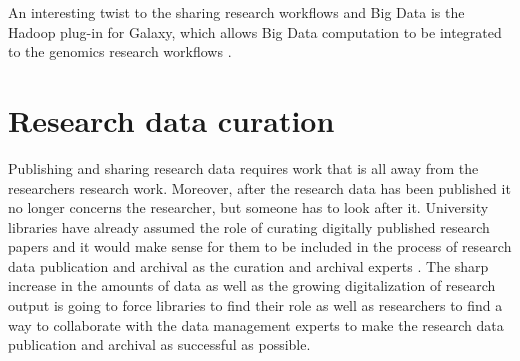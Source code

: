 An interesting twist to the sharing research workflows and Big Data is the
Hadoop plug-in for Galaxy, which allows Big Data computation to be integrated
to the genomics research workflows \cite{DBLP:conf/bcb/PiredduLSZ14}.

\section{Research data curation}

Publishing and sharing research data requires work that is all away from the
researchers research work. Moreover, after the research data has been published
it no longer concerns the researcher, but someone has to look after it.
University libraries have already assumed the role of curating digitally
published research papers and it would make sense for them to be included in
the process of research data publication and archival as the curation and
archival experts  \cite{hjorland2014curating} \cite{heidorn2011emerging}. The
sharp increase in the amounts of data as well as the growing digitalization of
research output is going to force libraries to find their role as well as
researchers to find a way to collaborate with the data management experts to
make the research data publication and archival as successful as possible.

